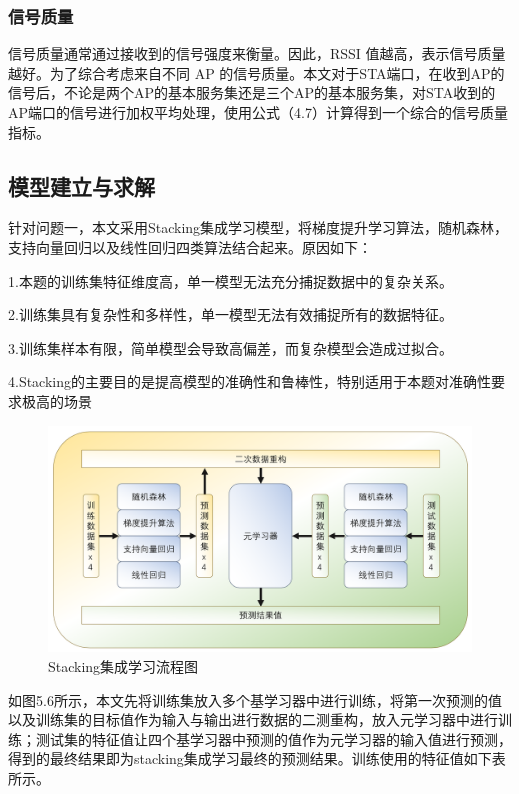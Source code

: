 \subsubsection{信号质量}



信号质量通常通过接收到的信号强度来衡量。因此，RSSI 值越高，表示信号质量越好。为了综合考虑来自不同 AP 的信号质量。本文对于STA端口，在收到AP的信号后，不论是两个AP的基本服务集还是三个AP的基本服务集，对STA收到的AP端口的信号进行加权平均处理，使用公式（4.7）计算得到一个综合的信号质量指标。




\subsection{模型建立与求解}

针对问题一，本文采用Stacking集成学习模型，将梯度提升学习算法，随机森林，支持向量回归以及线性回归四类算法结合起来。原因如下：

1.本题的训练集特征维度高，单一模型无法充分捕捉数据中的复杂关系。

2.训练集具有复杂性和多样性，单一模型无法有效捕捉所有的数据特征。

3.训练集样本有限，简单模型会导致高偏差，而复杂模型会造成过拟合。

4.Stacking的主要目的是提高模型的准确性和鲁棒性，特别适用于本题对准确性要求极高的场景


\begin{figure}[H]
	\centering
	\includegraphics[width=0.7\linewidth]{figures/stacking}
	\caption{Stacking集成学习流程图}
	\label{fig:Stacking集成学习流程图}
\end{figure}

如图5.6所示，本文先将训练集放入多个基学习器中进行训练，将第一次预测的值以及训练集的目标值作为输入与输出进行数据的二测重构，放入元学习器中进行训练；测试集的特征值让四个基学习器中预测的值作为元学习器的输入值进行预测，得到的最终结果即为stacking集成学习最终的预测结果。训练使用的特征值如下表所示。

